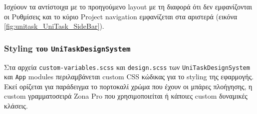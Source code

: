                 Ισχύουν τα αντίστοιχα με το προηγούμενο layout με τη διαφορά ότι δεν εμφανίζονται οι Ρυθμίσεις και το κύριο Project navigation εμφανίζεται στα αριστερά (εικόνα \ref{fig:unitask_UniTask_SideBar}).

            \subsubsection{Styling του \texttt{UniTaskDesignSystem}}
                Στα αρχεία \texttt{custom-variables.scss} και \texttt{design.scss} των \texttt{UniTaskDesignSystem} και \texttt{App} modules περιλαμβάνεται custom CSS κώδικας για το styling της εφαρμογής. Εκεί ορίζεται για παράδειγμα το πορτοκαλί χρώμα που έχουν οι μπάρες πλοήγησης, η custom γραμματοσειρά Zona Pro που χρησιμοποιείται ή κάποιες custom δυναμικές κλάσεις.